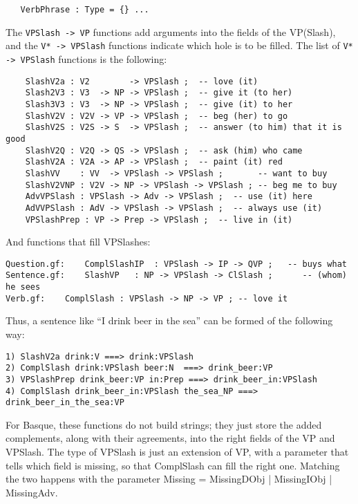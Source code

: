 \documentclass[11pt,a4paper]{article}
\begin{document}
   \begin{verbatim}
   VerbPhrase : Type = {} ...
   \end{verbatim}

   The \verb!VPSlash -> VP! functions add arguments into the fields of the VP(Slash), and the \verb!V* -> VPSlash! functions indicate which hole is to be filled. The list of \verb!V* -> VPSlash! functions is the following:

   \begin{verbatim}
    SlashV2a : V2        -> VPSlash ;  -- love (it)
    Slash2V3 : V3  -> NP -> VPSlash ;  -- give it (to her)
    Slash3V3 : V3  -> NP -> VPSlash ;  -- give (it) to her
    SlashV2V : V2V -> VP -> VPSlash ;  -- beg (her) to go
    SlashV2S : V2S -> S  -> VPSlash ;  -- answer (to him) that it is good
    SlashV2Q : V2Q -> QS -> VPSlash ;  -- ask (him) who came
    SlashV2A : V2A -> AP -> VPSlash ;  -- paint (it) red
    SlashVV    : VV  -> VPSlash -> VPSlash ;       -- want to buy
    SlashV2VNP : V2V -> NP -> VPSlash -> VPSlash ; -- beg me to buy
    AdvVPSlash : VPSlash -> Adv -> VPSlash ;  -- use (it) here
    AdVVPSlash : AdV -> VPSlash -> VPSlash ;  -- always use (it)
    VPSlashPrep : VP -> Prep -> VPSlash ;  -- live in (it) 
   \end{verbatim}

And functions that fill VPSlashes:

\begin{verbatim}
Question.gf:    ComplSlashIP  : VPSlash -> IP -> QVP ;   -- buys what 
Sentence.gf:    SlashVP   : NP -> VPSlash -> ClSlash ;      -- (whom) he sees
Verb.gf:    ComplSlash : VPSlash -> NP -> VP ; -- love it
\end{verbatim}

Thus, a sentence like ``I drink beer in the sea'' can be formed of the following way:

\begin{verbatim}
1) SlashV2a drink:V ===> drink:VPSlash
2) ComplSlash drink:VPSlash beer:N  ===> drink_beer:VP
3) VPSlashPrep drink_beer:VP in:Prep ===> drink_beer_in:VPSlash
4) ComplSlash drink_beer_in:VPSlash the_sea_NP ===> drink_beer_in_the_sea:VP
\end{verbatim}

For Basque, these functions do not build strings; they just store the added complements,
along with their agreements, into the right fields of the VP and VPSlash.
The type of VPSlash is just an extension of VP, with a parameter that tells which field is missing, so that ComplSlash can fill the right one.
Matching the two happens with the parameter Missing = MissingDObj | MissingIObj | MissingAdv.
\end{document}
